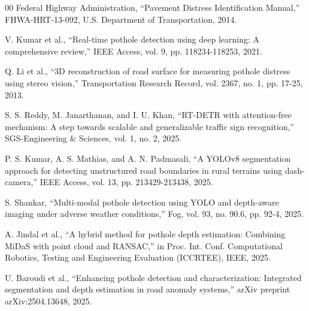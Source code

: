 \documentclass[conference]{IEEEtran}
\begin{document}
\begin{thebibliography}{00}
 Federal Highway Administration, ``Pavement Distress Identification Manual,'' FHWA-HRT-13-092, U.S. Department of Transportation, 2014.

 V. Kumar et al., ``Real-time pothole detection using deep learning: A comprehensive review,'' IEEE Access, vol. 9, pp. 118234-118253, 2021.

 Q. Li et al., ``3D reconstruction of road surface for measuring pothole distress using stereo vision,'' Transportation Research Record, vol. 2367, no. 1, pp. 17-25, 2013.

 S. S. Reddy, M. Janarthanan, and I. U. Khan, ``RT-DETR with attention-free mechanism: A step towards scalable and generalizable traffic sign recognition,'' SGS-Engineering \& Sciences, vol. 1, no. 2, 2025.

 P. S. Kumar, A. S. Mathias, and A. N. Padmasali, ``A YOLOv8 segmentation approach for detecting unstructured road boundaries in rural terrains using dash-camera,'' IEEE Access, vol. 13, pp. 213429-213438, 2025.

 S. Shankar, ``Multi-modal pothole detection using YOLO and depth-aware imaging under adverse weather conditions,'' Fog, vol. 93, no. 90.6, pp. 92-4, 2025.

 A. Jindal et al., ``A hybrid method for pothole depth estimation: Combining MiDaS with point cloud and RANSAC,'' in Proc. Int. Conf. Computational Robotics, Testing and Engineering Evaluation (ICCRTEE), IEEE, 2025.

 U. Baroudi et al., ``Enhancing pothole detection and characterization: Integrated segmentation and depth estimation in road anomaly systems,'' arXiv preprint arXiv:2504.13648, 2025.

\end{thebibliography}

\vspace{12pt}
\end{document}
